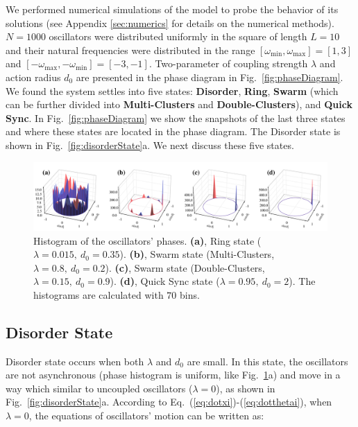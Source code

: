 \documentclass[%
 aip,
 amsmath,amssymb,
 reprint,%
]{revtex4-1}
\begin{document}
We performed numerical simulations of the model to probe the behavior of its solutions (see Appendix \ref{sec:numerics} for details on the numerical methods). 
$N=1000$ oscillators were distributed uniformly in the square of length $L=10$ and their natural frequencies were distributed in the range $\left[ \omega _{\min},\omega _{\max} \right]=\left[ 1,3 \right]$ and $\left[ -\omega _{\max},-\omega _{\min} \right]=\left[ -3,-1 \right]$.
Two-parameter of coupling strength $\lambda$ and action radius $d_0$ are presented in the phase diagram in Fig.~\ref{fig:phaseDiagram}. We found the system settles into five states: \textbf{Disorder}, \textbf{Ring}, \textbf{Swarm} (which can be further divided into \textbf{Multi-Clusters} and \textbf{Double-Clusters}), and \textbf{Quick Sync}. In Fig.~\ref{fig:phaseDiagram} we show the snapshots of the last three states and where these states are located in the phase diagram. The Disorder state is shown in Fig.~\ref{fig:disorderState}a.
We next discuss these five states.

\begin{figure}
    \includegraphics[width=\textwidth]{./figs/phaseHist.pdf}
    \caption{
        \label{fig:phaseHist} Histogram of the oscillators' phases.
        \textbf{(a)}, Ring state ($\lambda=0.015,\ d_0=0.35$).
        \textbf{(b)}, Swarm state (Multi-Clusters, $\lambda=0.8,\ d_0=0.2$).
        \textbf{(c)}, Swarm state (Double-Clusters, $\lambda=0.15,\ d_0=0.9$).
        \textbf{(d)}, Quick Sync state ($\lambda=0.95,\ d_0=2$). The histograms are calculated with $70$ bins.
    }
\end{figure}



\subsection{Disorder State}

Disorder state occurs when both $\lambda$ and $d_0$ are small. In this state, the oscillators are not asynchronous (phase histogram is uniform, like Fig.~\ref{fig:phaseHist}a) and move in a way which similar to uncoupled oscillators ($\lambda=0$), as shown in Fig.~\ref{fig:disorderState}a. According to Eq.~(\ref{eq:dotxi})-(\ref{eq:dotthetai}), when $\lambda=0$, the equations of oscillators' motion can be written as:
\end{document}
